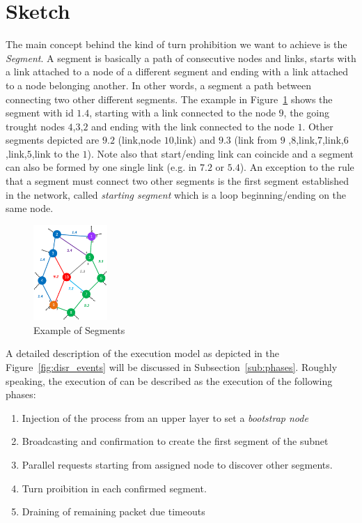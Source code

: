 
\section{\disr{} Sketch}

\label{sec:disr_concepts}
The main concept behind the kind of turn prohibition we want to
achieve is the \emph{Segment}. A segment is basically a path of consecutive
nodes and links, starts with a link attached to a node of a different
segment and ending with a link attached to a
node belonging another. In other words, a segment
a path between connecting two other different segments. The example
in Figure~\ref{fig:segments} shows the segment with id $1.4$, starting
with a link connected to the node $9$, the going trought nodes
$4$,$3$,$2$ and ending with the link connected to the node $1$. Other
segments depicted are $9.2$ (link,node $10$,link) and $9.3$
(link from $9$ ,$8$,link,$7$,link,$6$,link,$5$,link to the $1$). Note
also that start/ending link can coincide and a segment can also be
formed by one single link (e.g. in $7.2$ or $5.4$).
An exception to the rule that a segment must connect two other
segments is the first segment established in the network, called
\emph{starting segment} which is a loop beginning/ending on the same
node.

\begin{figure}
\centering
    \includegraphics[width=0.25\textwidth]{pictures/network_slice.eps}
  \caption{Example of Segments}
  \label{fig:segments}
\end{figure}

A detailed description of the \disr{} execution model as depicted in
the Figure~\ref{fig:disr_events} will be discussed in
Subsection~\ref{sub:phases}. Roughly speaking, the execution of can be described as the execution
of the following phases: 
\begin{enumerate}
\item Injection of the \disr{} process from an upper layer to set a \emph{bootstrap
node} 
\item Broadcasting and confirmation to create the first segment of the subnet
\item Parallel requests starting from assigned node to discover other
segments. 
\item Turn proibition in each confirmed segment.
\item Draining of remaining packet due timeouts
\end{enumerate}

